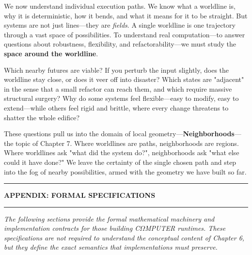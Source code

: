 We now understand individual execution paths. We know what a worldline is, why it is deterministic,
how it bends, and what it means for it to be straight. But systems are not just lines—they are
\emph{fields}. A single worldline is one trajectory through a vast space of possibilities. To
understand real computation—to answer questions about robustness, flexibility, and refactorability—we
must study the \textbf{space around the worldline}.

Which nearby futures are viable? If you perturb the input slightly, does the worldline stay close, or
does it veer off into disaster? Which states are "adjacent" in the sense that a small refactor can
reach them, and which require massive structural surgery? Why do some systems feel flexible—easy to
modify, easy to extend—while others feel rigid and brittle, where every change threatens to shatter
the whole edifice?

These questions pull us into the domain of local geometry—\textbf{Neighborhoods}—the topic of
Chapter 7. Where worldlines are paths, neighborhoods are regions. Where worldlines ask "what did the
system do?", neighborhoods ask "what else could it have done?" We leave the certainty of the single
chosen path and step into the fog of nearby possibilities, armed with the geometry we have built so
far.

\clearpage

\begin{center}
\rule{0.7\linewidth}{1.5pt}
\vspace{0.3cm}

{\Large \textbf{APPENDIX: FORMAL SPECIFICATIONS}}

\vspace{0.2cm}
\rule{0.7\linewidth}{1.5pt}
\end{center}

\vspace{0.5cm}

\noindent\textit{The following sections provide the formal mathematical machinery and implementation contracts
for those building C$\Omega$MPUTER runtimes. These specifications are not required to understand the
conceptual content of Chapter 6, but they define the exact semantics that implementations must preserve.}

\vspace{0.5cm}

